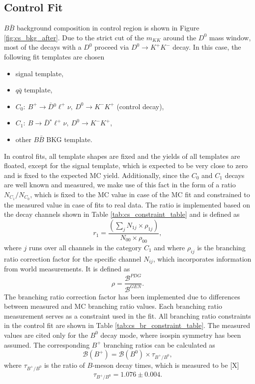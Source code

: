\subsection{Control Fit}\label{sec:control-fit}
$B \bar B$ background composition in control region is shown in Figure \ref{fig:cs_bkg_after}. Due to the strict cut of the $m_{KK}$ around the $D^0$ mass window, most of the decays with a $D^0$ proceed via $D^0 \to K^+K^-$ decay. In this case, the following fit templates are chosen
\begin{itemize}
	\item signal template,
	\item $q \bar q$ template,
	\item $C_0:~B^+ \to \bar{D} {}^0 \ell^+ \nu,~D^0 \to K^-K^+$ (control decay),
	\item $C_1:~B \to \bar{D} {}^* \ell^+ \nu,~D^0 \to K^-K^+$,
	\item other $B \bar B$ BKG template.
\end{itemize}
In control fits, all template shapes are fixed and the yields of all templates are floated, except for the signal template, which is expected to be very close to zero and is fixed to the expected MC yield. Additionally, since the $C_0$ and $C_1$ decays are well known and measured, we make use of this fact in the form of a ratio $N_{C_1}/N_{C_0}$, which is fixed to the MC value in case of the MC fit and constrained to the measured value in case of fits to real data. The ratio is implemented based on the decay channels shown in Table \ref{tab:cs_constraint_table} and is defined as
\begin{equation}
r_1 = \frac{\left(\sum_j N_{1j}\times \rho_{1j} \right)}{N_{00} \times \rho_{00}},
\label{eq:cs_fix}
\end{equation}
where $j$ runs over all channels in the category $C_1$ and where $\rho_{ij}$ is the branching ratio correction factor for the specific channel $N_{ij}$, which incorporates information from world measurements. It is defined as 
\begin{equation}
\rho = \frac{\mathcal{B}^{PDG}}{\mathcal{B}^{GEN}}.
\label{eq:br_fix}
\end{equation}
The branching ratio correction factor has been implemented due to differences between measured and MC branching ratio values. Each branching ratio measurement serves as a constraint used in the fit. All branching ratio constraints in the control fit are shown in Table \ref{tab:cs_br_constraint_table}. The measured values are cited only for the $B^0$ decay mode, where isospin symmetry has been assumed. The corresponding $B^+$ branching ratios can be calculated as
\begin{equation}
\mathcal{B}(B^+) = \mathcal{B}(B^0) \times \tau_{B^+/B^0},
\end{equation}
where $\tau_{B^+/B^0}$ is the ratio of $B$-meson decay times, which is measured to be [X]
\begin{equation}
\tau_{B^+/B^0} = 1.076 \pm 0.004.
\end{equation}

